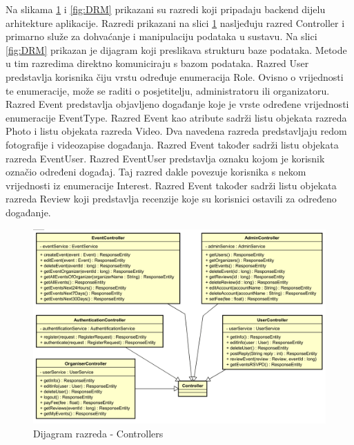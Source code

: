 			Na slikama \ref{fig:DRC} i \ref{fig:DRM} prikazani su razredi koji pripadaju backend dijelu arhitekture aplikacije. Razredi prikazani na slici \ref{fig:DRC} nasljeđuju razred Controller i primarno služe za dohvaćanje i manipulaciju podataka u sustavu. Na slici \ref{fig:DRM} prikazan je dijagram koji preslikava strukturu baze podataka. Metode u tim razredima direktno komuniciraju s bazom podataka. Razred User predstavlja korisnika čiju vrstu određuje enumeracija Role. Ovisno o vrijednosti te enumeracije, može se raditi o posjetitelju, administratoru ili organizatoru. Razred Event predstavlja objavljeno događanje koje je vrste određene vrijednosti enumeracije EventType. Razred Event kao atribute sadrži listu objekata razreda Photo i listu objekata razreda Video. Dva navedena razreda predstavljaju redom fotografije i videozapise događanja. Razred Event također sadrži listu objekata razreda EventUser. Razred EventUser predstavlja oznaku kojom je korisnik označio određeni događaj. Taj razred dakle povezuje korisnika s nekom vrijednosti iz enumeracije Interest. Razred Event također sadrži listu objekata razreda Review koji predstavlja recenzije koje su korisnici ostavili za određeno događanje.
		
		
		\begin{figure}[H]
			\includegraphics[width=\textwidth]{slike/DRC-1.PNG} %
			\caption{Dijagram razreda - Controllers}
			\label{fig:DRC} %
		\end{figure}
			
